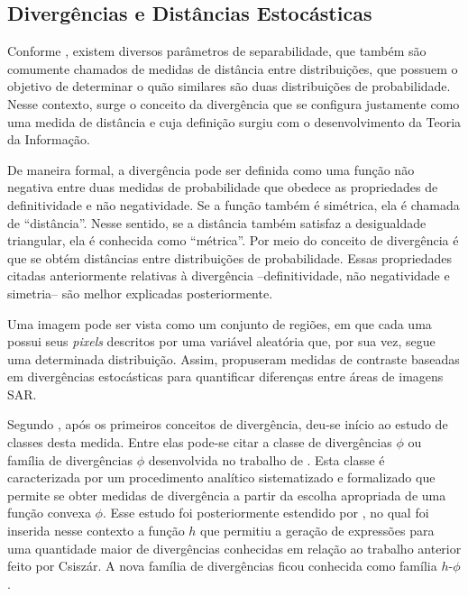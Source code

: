 \subsection{Divergências e Distâncias Estocásticas}

Conforme \citet{tese_abraao}, existem diversos parâmetros de separabilidade, que também são comumente chamados de medidas de distância entre distribuições, que possuem o objetivo de determinar o quão similares são duas distribuições de probabilidade. 
Nesse contexto, surge o conceito da divergência que se configura justamente como uma medida de distância e cuja definição surgiu com o desenvolvimento da Teoria da Informação. 

De maneira formal, a divergência pode ser definida como uma função não negativa entre duas medidas de probabilidade que obedece as propriedades de definitividade e não negatividade. 
Se a função também é simétrica, ela é chamada de ``distância''. 
Nesse sentido, se a distância também satisfaz a desigualdade triangular, ela é conhecida como ``métrica''. 
Por meio do conceito de divergência é que se obtém distâncias entre distribuições de probabilidade. 
Essas propriedades citadas anteriormente relativas à divergência --definitividade, não negatividade e simetria-- são melhor explicadas posteriormente.

Uma imagem pode ser vista como um conjunto de regiões, em que cada uma possui seus \textit{pixels} descritos por uma variável aleatória que, por sua vez, segue uma determinada distribuição. 
Assim, \citet{Nascimento2010} propuseram medidas de contraste baseadas em divergências estocásticas para quantificar diferenças entre áreas de imagens SAR. 

Segundo \citet{tese_abraao}, após os primeiros conceitos de divergência, deu-se início ao estudo de classes desta medida. 
Entre elas pode-se citar a classe de divergências $\phi$ ou família de divergências $\phi$ desenvolvida no trabalho de \citet{Csiszar67}. 
Esta classe é caracterizada por um procedimento analítico sistematizado e formalizado que permite se obter medidas de divergência a partir da escolha apropriada de uma função convexa $\phi$. 
Esse estudo foi posteriormente estendido por \citet{salicruetal1993}, no qual foi inserida nesse contexto a função $h$ que permitiu a geração de expressões para uma quantidade maior de divergências conhecidas em relação ao trabalho anterior feito por Csiszár. 
A nova família de divergências ficou conhecida como família $h$-$\phi$. 


